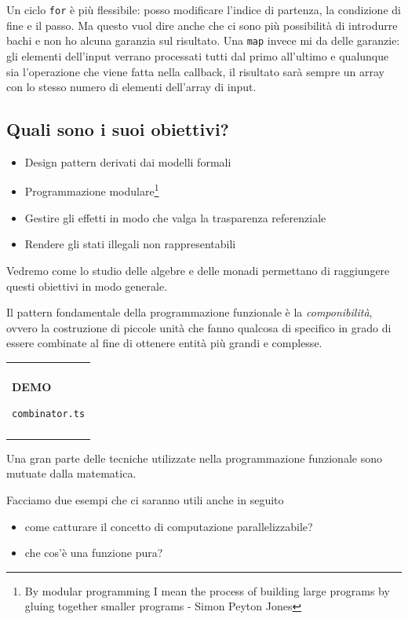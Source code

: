 \documentclass[12pt]{article}
\newenvironment{demo}
    {\begin{center}
    \begin{tabular}{|p{0.9\textwidth}|}
    \hline\\
    }
    {
    \\\\\hline
    \end{tabular}
    \end{center}
    }
\begin{document}
Un ciclo \texttt{for} è più flessibile: posso modificare l'indice di partenza, la condizione di fine e il passo.
Ma questo vuol dire anche che ci sono più possibilità di introdurre bachi e non ho alcuna garanzia sul risultato.
Una \texttt{map} invece mi da delle garanzie: gli elementi dell'input verrano processati tutti dal primo all'ultimo e
qualunque sia l'operazione che viene fatta nella callback, il risultato sarà sempre un array con lo stesso numero di elementi
dell'array di input.

\subsection{Quali sono i suoi obiettivi?}

\begin{itemize}
  \item Design pattern derivati dai modelli formali
  \item Programmazione modulare\footnote{By modular programming I mean the process of building large programs by gluing together smaller programs - Simon Peyton Jones}
  \item Gestire gli effetti in modo che valga la trasparenza referenziale
  \item Rendere gli stati illegali non rappresentabili
\end{itemize}

Vedremo come lo studio delle algebre e delle monadi permettano di raggiungere questi obiettivi in modo generale.

Il pattern fondamentale della programmazione funzionale è la \emph{componibilità}, ovvero la costruzione di piccole unità
che fanno qualcosa di specifico in grado di essere combinate al fine di ottenere entità più grandi e complesse.

\begin{demo}
\begin{center}
\textbf{DEMO}

\texttt{combinator.ts}
\end{center}
\end{demo}

Una gran parte delle tecniche utilizzate nella programmazione funzionale sono mutuate dalla matematica.

Facciamo due esempi che ci saranno utili anche in seguito

\begin{itemize}
  \item come catturare il concetto di computazione parallelizzabile?
  \item che cos'è una funzione pura?
\end{itemize}
\end{document}
